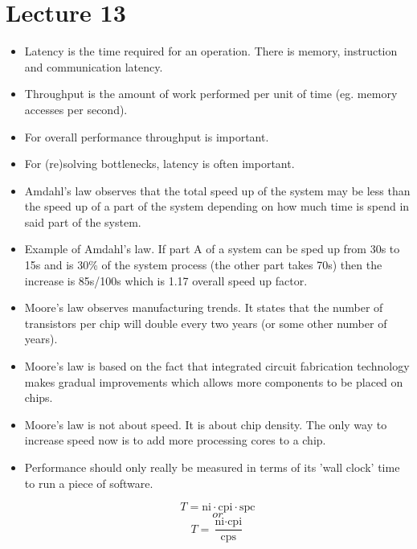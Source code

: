 \documentclass{article}
\begin{document}
\section*{Lecture 13}
\begin{itemize}
\item Latency is the time required for an operation. There is memory, instruction and communication latency.
\item Throughput is the amount of work performed per unit of time (eg. memory accesses per second).
\item For overall performance throughput is important.
\item For (re)solving bottlenecks, latency is often important.
\item Amdahl's law observes that the total speed up of the system may be less than the speed up of a part of the system depending on how much time is spend in said part of the system.
\item Example of Amdahl's law. If part A of a system can be sped up from 30s to 15s and is 30\% of the system process (the other part takes 70s) then the increase is 85s/100s which is 1.17 overall speed up factor.
\item Moore's law observes manufacturing trends. It states that the number of transistors per chip will double every two years (or some other number of years). 
\item Moore's law is based on the fact that integrated circuit fabrication technology makes gradual improvements which allows more components to be placed on chips.
\item Moore's law is not about speed. It is about chip density. The only way to increase speed now is to add more processing cores to a chip.
\item Performance should only really be measured in terms of its 'wall clock' time to run a piece of software.

\[  T = \text{ni} \cdot \text{cpi} \cdot \text{spc} \]
\[or\]
\[ T = \frac{\text{ni} \cdot \text{cpi}}{\text{cps}} \]


\end{itemize}
\end{document}
